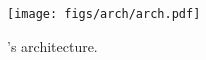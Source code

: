 \begin{figure}[b]
    \centering
    \texttt{[image: figs/arch/arch.pdf]}

    \caption{
        \xxx's architecture. 
    }

    \label{fig:arch}
\end{figure}
